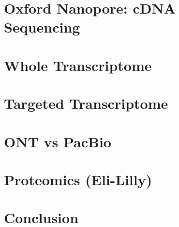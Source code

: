 \documentclass[a4paper,12pt,oneside]{report}
\begin{document}
\chapter{Oxford Nanopore: cDNA Sequencing}



\chapter{Whole Transcriptome}


\chapter{Targeted Transcriptome}

%

\chapter{ONT vs PacBio}


\chapter{Proteomics (Eli-Lilly)}

\chapter{Conclusion}
%


\end{document}
